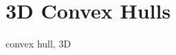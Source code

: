 \chapter{3D Convex Hulls}
\label{chap:convex_hull_3}
\minitoc
{}

\begin{ccPackage}{convex hull, 3D}


\end{ccPackage}
